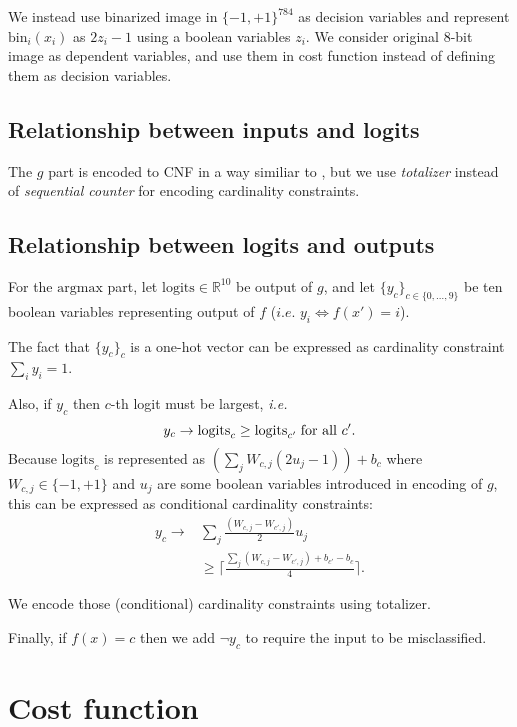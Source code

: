 \documentclass[conference]{IEEEtran}
\begin{document}
We instead use binarized image in $\{-1,+1\}^{784}$ as decision variables and represent $\mathrm{bin}_i(x_i)$ as $2 z_i - 1$ using a boolean variables $z_i$.
We consider original 8-bit image as dependent variables, and use them in cost function instead of defining them as decision variables.

\subsection{Relationship between inputs and logits}

The $g$ part is encoded to CNF in a way similiar to \cite{bnnverif}, but we use \textit{totalizer} \cite{totalizer} instead of \textit{sequential counter} \cite{sequential-counter} for encoding cardinality constraints.

\subsection{Relationship between logits and outputs}

For the $\mathrm{argmax}$ part, let $\mathrm{logits} \in \mathbb{R}^{10}$ be output of $g$, and let $\{y_c\}_{c\in\{0,\ldots,9\}}$ be ten boolean variables representing output of $f$ ($i.e.$ $y_i \Leftrightarrow f(x') = i$).

The fact that $\{y_c\}_{c}$ is a one-hot vector can be expressed as cardinality constraint $\sum_i y_i = 1$.

Also, if $y_c$ then $c$-th logit must be largest, \textit{i.e.}
\[
y_c \rightarrow \mathrm{logits}_c \ge \mathrm{logits}_{c'} \text{\;for all $c'$}.
\]
Because $\mathrm{logits}_c$ is represented as $(\sum_j W_{c,j} (2 u_j - 1)) + b_c$ where $W_{c,j} \in \{-1, +1\}$ and $u_j$ are some boolean variables introduced in encoding of $g$, this can be expressed as conditional cardinality constraints:
\begin{align*}
y_c \rightarrow
& \sum_j \frac{(W_{c,j} - W_{c',j})}{2} u_j \\
& \ge \Big\lceil \frac{\sum_j (W_{c,j} - W_{c',j}) + b_{c'} - b_c}{4}\Big\rceil.
\end{align*}

We encode those (conditional) cardinality constraints using totalizer.

Finally, if $f(x) = c$ then we add $\neg y_c$ to require the input to be misclassified.

\section{Cost function}
\end{document}
